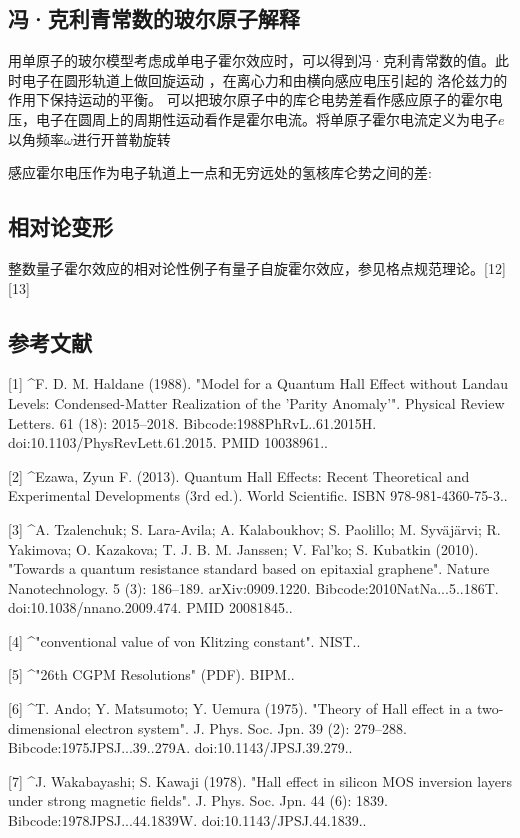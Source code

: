 \subsection{冯·克利青常数的玻尔原子解释}
用单原子的玻尔模型考虑成单电子霍尔效应时，可以得到冯·克利青常数的值。此时电子在圆形轨道上做回旋运动 ，在离心力和由横向感应电压引起的 洛伦兹力的作用下保持运动的平衡。 可以把玻尔原子中的库仑电势差看作感应原子的霍尔电压，电子在圆周上的周期性运动看作是霍尔电流。将单原子霍尔电流定义为电子$e$以角频率$\omega$进行开普勒旋转

感应霍尔电压作为电子轨道上一点和无穷远处的氢核库仑势之间的差:

\subsection{相对论变形}
整数量子霍尔效应的相对论性例子有量子自旋霍尔效应，参见格点规范理论。[12][13]

\subsection{参考文献}
[1]
^F. D. M. Haldane (1988). "Model for a Quantum Hall Effect without Landau Levels: Condensed-Matter Realization of the 'Parity Anomaly'". Physical Review Letters. 61 (18): 2015–2018. Bibcode:1988PhRvL..61.2015H. doi:10.1103/PhysRevLett.61.2015. PMID 10038961..

[2]
^Ezawa, Zyun F. (2013). Quantum Hall Effects: Recent Theoretical and Experimental Developments (3rd ed.). World Scientific. ISBN 978-981-4360-75-3..

[3]
^A. Tzalenchuk; S. Lara-Avila; A. Kalaboukhov; S. Paolillo; M. Syväjärvi; R. Yakimova; O. Kazakova; T. J. B. M. Janssen; V. Fal'ko; S. Kubatkin (2010). "Towards a quantum resistance standard based on epitaxial graphene". Nature Nanotechnology. 5 (3): 186–189. arXiv:0909.1220. Bibcode:2010NatNa...5..186T. doi:10.1038/nnano.2009.474. PMID 20081845..

[4]
^"conventional value of von Klitzing constant". NIST..

[5]
^"26th CGPM Resolutions" (PDF). BIPM..

[6]
^T. Ando; Y. Matsumoto; Y. Uemura (1975). "Theory of Hall effect in a two-dimensional electron system". J. Phys. Soc. Jpn. 39 (2): 279–288. Bibcode:1975JPSJ...39..279A. doi:10.1143/JPSJ.39.279..

[7]
^J. Wakabayashi; S. Kawaji (1978). "Hall effect in silicon MOS inversion layers under strong magnetic fields". J. Phys. Soc. Jpn. 44 (6): 1839. Bibcode:1978JPSJ...44.1839W. doi:10.1143/JPSJ.44.1839..


